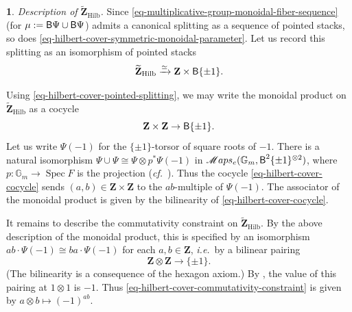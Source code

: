 \documentclass[10pt,english,reqno]{amsart}
\newcommand{\integers}{\mathbf Z}
\newcommand{\SMaps}{\mathscr{M}aps}
\newcommand{\deloop}{\textnormal{\textsf{B}}}
\newcommand{\Spec}{\operatorname{Spec}}
\newcommand{\Hilbert}{\mathrm{Hilb}}
\theoremstyle{definition}
\numberwithin{equation}{section}
\newtheorem{untitledsubsubsection}[subsubsection]{}
\newenvironment{void}
{\begin{untitledsubsubsection}}
{\end{untitledsubsubsection}}
\begin{document}
\begin{void}\emph{Description of $\widetilde{\integers}_{\Hilbert}$.}
Since \eqref{eq-multiplicative-group-monoidal-fiber-sequence} (for $\mu := \deloop\Psi\cup \deloop\Psi$) admits a canonical splitting as a sequence of pointed stacks, so does \eqref{eq-hilbert-cover-symmetric-monoidal-parameter}. Let us record this splitting as an isomorphism of pointed stacks
\begin{equation}
\label{eq-hilbert-cover-pointed-splitting}
\widetilde{\integers}_{\Hilbert} \xrightarrow{\simeq} \integers \times \deloop\{\pm 1\}.
\end{equation}

Using \eqref{eq-hilbert-cover-pointed-splitting}, we may write the monoidal product on $\widetilde{\integers}_{\Hilbert}$ as a cocycle
\begin{equation}
\label{eq-hilbert-cover-cocycle}
\integers\times \integers \rightarrow \deloop \{\pm 1\}.
\end{equation}
Let us write $\Psi(-1)$ for the $\{\pm 1\}$-torsor of square roots of $-1$. There is a natural isomorphism $\Psi\cup\Psi \cong \Psi \otimes p^*\Psi(-1)$ in $\SMaps_e(\mathbb G_m, \deloop^2\{\pm 1\}^{\otimes 2})$, where $p : \mathbb G_m \rightarrow \Spec F$ is the projection (\emph{cf.}~\cite[Theorem 3.1.5]{zhao2022metaplectic}). Thus the cocycle \eqref{eq-hilbert-cover-cocycle} sends $(a, b) \in \integers\times \integers$ to the $ab$-multiple of $\Psi(-1)$. The associator of the monoidal product is given by the bilinearity of \eqref{eq-hilbert-cover-cocycle}.

It remains to describe the commutativity constraint on $\widetilde{\integers}_{\Hilbert}$. By the above description of the monoidal product, this is specified by an isomorphism $ab\cdot\Psi(-1) \cong ba \cdot \Psi(-1)$ for each $a, b\in \integers$, \emph{i.e.}~by a bilinear pairing
\begin{equation}
\label{eq-hilbert-cover-commutativity-constraint}
\integers \otimes \integers \rightarrow \{\pm 1\}.
\end{equation}
(The bilinearity is a consequence of the hexagon axiom.) By \cite[Proposition 4.6.6]{zhao2022metaplectic}, the value of this pairing at $1\otimes 1$ is $-1$. Thus \eqref{eq-hilbert-cover-commutativity-constraint} is given by $a\otimes b\mapsto (-1)^{ab}$.
\end{void}

\end{document}
